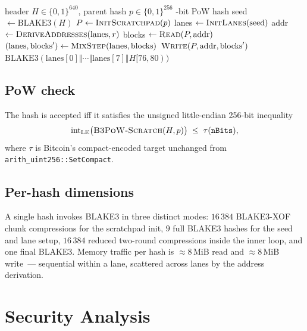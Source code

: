 \documentclass[11pt,a4paper]{article}
\theoremstyle{plain}
\theoremstyle{definition}
\theoremstyle{remark}
\begin{document}
\begin{algorithm}[t]
\caption{\textsc{B3PoW-Scratch}; the top-level hash.}
\label{alg:top}
\begin{algorithmic}[1]
\Require header $H\in\{0,1\}^{640}$, parent hash $p\in\{0,1\}^{256}$
-bit PoW hash
\State seed $\gets \mathrm{BLAKE3}(H)$
\State $P \gets \textsc{InitScratchpad}(p)$
\State lanes $\gets \textsc{InitLanes}(\text{seed})$
  \State addr $\gets \textsc{DeriveAddresses}(\text{lanes}, r)$
  \State blocks $\gets \textsc{Read}(P, \text{addr})$
  \State $(\text{lanes}, \text{blocks}') \gets
         \textsc{MixStep}(\text{lanes}, \text{blocks})$
  \State $\textsc{Write}(P, \text{addr}, \text{blocks}')$
\EndFor
\State \Return $\mathrm{BLAKE3}(\text{lanes}[0] \Vert \cdots \Vert
       \text{lanes}[7] \Vert H[76, 80))$
\end{algorithmic}
\end{algorithm}

\subsection{PoW check}\label{sec:algo-check}

The hash is accepted iff it satisfies the unsigned little-endian
256-bit inequality
\begin{equation}\label{eq:powcheck}
\mathrm{int}_{\mathrm{LE}}\bigl(\textsc{B3PoW-Scratch}(H, p)\bigr)
\;\le\; \tau(\texttt{nBits}),
\end{equation}
where $\tau$ is Bitcoin's compact-encoded target unchanged from
\texttt{arith\_uint256::SetCompact}.

\subsection{Per-hash dimensions}\label{sec:algo-dims}

A single hash invokes BLAKE3 in three distinct modes: $16\,384$
BLAKE3-XOF chunk compressions for the scratchpad init, $9$ full
BLAKE3 hashes for the seed and lane setup, $16\,384$ reduced
two-round compressions inside the inner loop, and one final
BLAKE3. Memory traffic per hash is $\approx 8$\,MiB read and
$\approx 8$\,MiB write~--- sequential within a lane, scattered
across lanes by the address derivation.

\section{Security Analysis}\label{sec:security}
\end{document}
